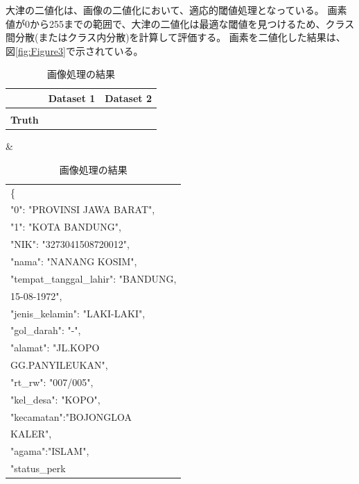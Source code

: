 \documentclass[uplatex, twocolumn,10pt]{jsarticle}
\begin{document}
大津の二値化は、画像の二値化において、適応的閾値処理となっている。
画素値が0から255までの範囲で、大津の二値化は最適な閾値を見つけるため、クラス間分散(またはクラス内分散)を計算して評価する。
画素を二値化した結果は、図\ref{fig:Figure3}で示されている。


\begin{table}[hbtp]
    \caption{画像処理の結果}
    \label{tb:Table1}
    \centering
    \begin{tabular}{|l|l|l|}
        \hline
                                       & \multicolumn{1}{c|}{\textbf{Dataset 1}} & \multicolumn{1}{c|}{\textbf{Dataset 2}} \\ 
        \hline
        \begin{tabular}[c]{@{}l@{}}\textbf{Ground}\\\textbf{Truth}\end{tabular}  & \begin{tabular}[l]{p{6cm}}\{\\"0": "PROVINSI JAWA BARAT", \\"1": "KOTA BANDUNG",\\"NIK": "3273041508720012", \\"nama": "NANANG KOSIM", \\"tempat\_tanggal\_lahir": "BANDUNG,\\15-08-1972",\\"jenis\_kelamin": "LAKI-LAKI",\\"gol\_darah": "-", \\"alamat": "JL.KOPO\\GG.PANYILEUKAN",\\"rt\_rw": "007/005",\\"kel\_desa": "KOPO", \\"kecamatan":"BOJONGLOA\\KALER",\\"agama":"ISLAM",\\"status\_perk
\end{tabular}
\end{table}
\end{document}
